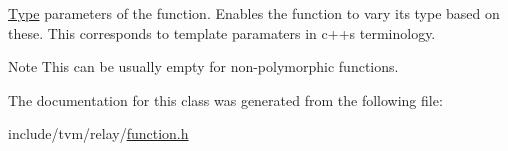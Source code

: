 \hyperlink{classtvm_1_1Type}{Type} parameters of the function. Enables the function to vary its type based on these. This corresponds to template paramaters in c++\textquotesingle{}s terminology. 

\begin{DoxyNote}{Note}
This can be usually empty for non-\/polymorphic functions. 
\end{DoxyNote}


The documentation for this class was generated from the following file\+:\begin{DoxyCompactItemize}
\item 
include/tvm/relay/\hyperlink{relay_2function_8h}{function.\+h}\end{DoxyCompactItemize}
